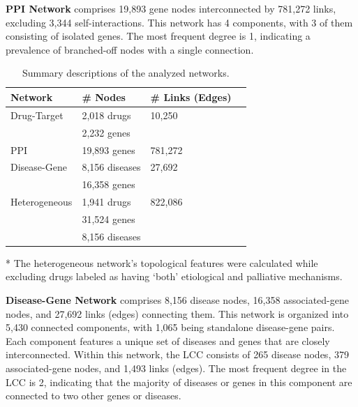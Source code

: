 \documentclass[journal,twoside,web]{ieeecolor}
\begin{document}
\textbf{PPI Network}
comprises 19,893 gene nodes interconnected by 781,272 links, excluding 3,344 self-interactions.
This network has 4 components, with 3 of them consisting of isolated genes.
The most frequent degree is 1, indicating a prevalence of branched-off nodes with a single connection.

\begin{table}
\caption{Summary descriptions of the analyzed networks.
\label{tbl:networkFeatures}}%
\begin{threeparttable}
\begin{tabular*}{\columnwidth}{@{\extracolsep\fill}llll@{\extracolsep\fill}}
\toprule
Network & \# Nodes  & \# Links (Edges)\\
\midrule
Drug-Target               & 2,018 drugs    & 10,250\\
                          & 2,232 genes            \\
\midrule
PPI                       & 19,893 genes   & 781,272\\
\midrule
Disease-Gene              & 8,156 diseases & 27,692\\
                          & 16,358 genes           \\  
\midrule
Heterogeneous\tnote{*}    & 1,941 drugs   & 822,086\\
                          & 31,524 genes           \\
                          & 8,156 diseases         \\
\bottomrule
\end{tabular*}
\begin{tablenotes}
\item[*] The heterogeneous network's topological features were calculated while excluding drugs labeled as having `both' etiological and palliative mechanisms.
\end{tablenotes}
\end{threeparttable}
\end{table}




\textbf{Disease-Gene Network}
comprises 8,156 disease nodes, 16,358 associated-gene nodes, and 27,692 links (edges) connecting them.
This network is organized into 5,430 connected components, with 1,065 being standalone disease-gene pairs.
Each component features a unique set of diseases and genes that are closely interconnected.
Within this network, the LCC consists of 265 disease nodes, 379 associated-gene nodes, and 1,493 links (edges).
The most frequent degree in the LCC is 2, indicating that the majority of diseases or genes in this component are connected to two other genes or diseases.
\end{document}
